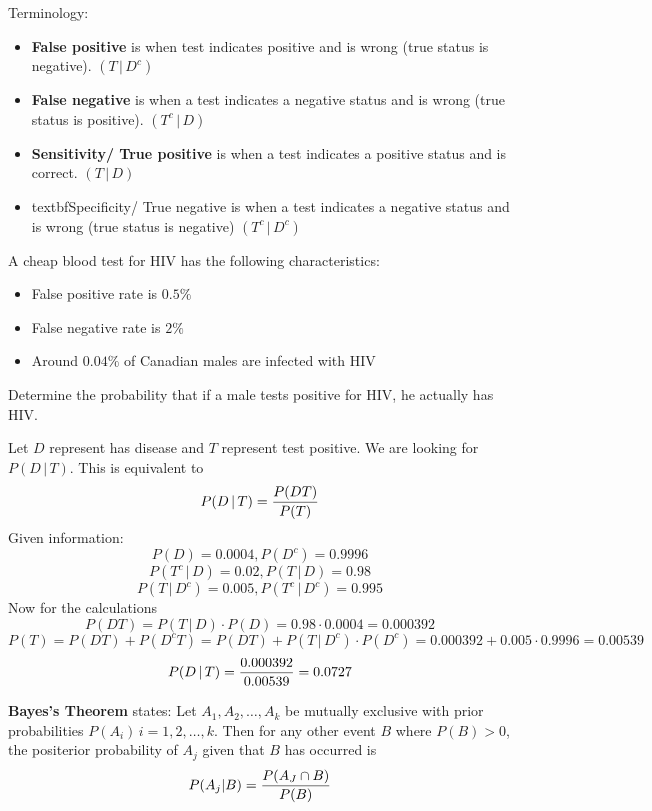 \documentclass[english, 12pt]{article}
\begin{document}
\begin{defn}
Terminology:
\begin{itemize}
\item \textbf{False positive} is when test indicates positive and is wrong (true status is negative). $(T\,|\,D^c)$
\item \textbf{False negative} is when a test indicates a negative status and is wrong (true status is positive). $(T^c\,|\,D)$
\item \textbf{Sensitivity/ True positive} is when a test indicates a positive status and is correct. $(T\,|\,D)$
\item textbf{Specificity/ True negative} is when a test indicates a negative status and is wrong (true status is negative) $(T^c\,|\,D^c)$
\end{itemize}
\end{defn}

\begin{exmp}
A cheap blood test for HIV has the following characteristics:
\begin{itemize}
\item False positive rate is $0.5\%$
\item False negative rate is $2\%$
\item Around $0.04\%$ of Canadian males are infected with HIV
\end{itemize}
Determine the probability that if a male tests positive for HIV, he actually has HIV.
\begin{sol}
Let $D$ represent has disease and $T$ represent test positive. We are looking for $P(D\,|\,T)$. This is equivalent to
\[P(D\,|\,T) = \frac{P(DT)}{P(T)}\]
Given information:
\[P(D) = 0.0004, P(D^c) = 0.9996\]
\[P(T^c\,|\,D)= 0.02, P(T\,|\,D) = 0.98\]
\[P(T\,|\,D^c) = 0.005, P(T^c\,|\,D^c) = 0.995\]
Now for the calculations
\[ P(DT) = P(T\,|\,D) \cdot P(D) = 0.98 \cdot 0.0004 = 0.000392\]
\[P(T) = P(DT) + P(D^cT) = P(DT) + P(T\,|\,D^c) \cdot P(D^c) = 0.000392 + 0.005 \cdot 0.9996 = 0.00539\]
\[P(D\,|\,T) = \frac{0.000392}{0.00539} = 0.0727\]
\end{sol}
\end{exmp}

\begin{thrm}
\textbf{Bayes's Theorem} states: Let $A_{1},A_{2},\dots,A_{k}$ be mutually exclusive with prior probabilities $P(A_{i})\,i=1,2,\dots,k$. Then for any other event $B$ where $P(B) > 0$, the positerior probability of $A_{j}$ given that $B$ has occurred is
\[P(A_{j} | B) = \frac{P(A_{J} \cap B)}{P(B)} \]
\end{thrm}
\end{document}
